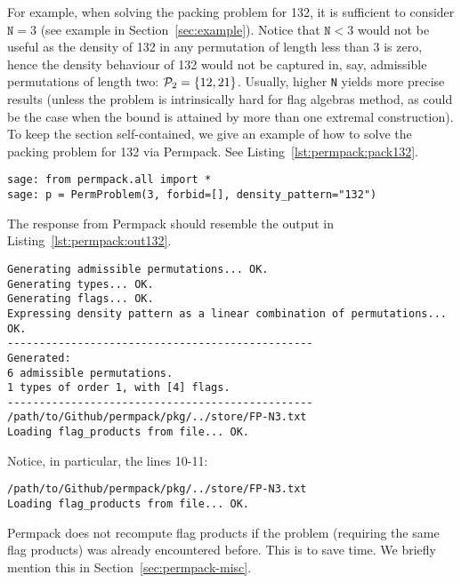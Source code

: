 For example, when solving the packing problem for 132, it is sufficient to consider $\texttt{N}=3$ (see example in Section~\ref{sec:example}). Notice that $\texttt{N}<3$ would not be useful as the density of 132 in any permutation of length less than 3 is zero, hence the density behaviour of 132 would not be captured in, say, admissible permutations of length two: $\P_2 = \{12,21\}$. Usually, higher \texttt{N} yields more precise results (unless the problem is intrinsically hard for flag algebras method, as could be the case when the bound is attained by more than one extremal construction). To keep the section self-contained, we give an example of how to solve the packing problem for 132 via Permpack. See Listing~\ref{lst:permpack:pack132}.

 {}
\begin{lstlisting}
sage: from permpack.all import *
sage: p = PermProblem(3, forbid=[], density_pattern="132")
\end{lstlisting}
The response from Permpack should resemble the output in Listing~\ref{lst:permpack:out132}.
\begin{lstlisting}
Generating admissible permutations... OK.
Generating types... OK.
Generating flags... OK.
Expressing density pattern as a linear combination of permutations... OK.
------------------------------------------------
Generated:
6 admissible permutations.
1 types of order 1, with [4] flags.
------------------------------------------------
/path/to/Github/permpack/pkg/../store/FP-N3.txt
Loading flag_products from file... OK.
\end{lstlisting}
Notice, in particular, the lines 10-11:
\begin{lstlisting}
/path/to/Github/permpack/pkg/../store/FP-N3.txt
Loading flag_products from file... OK.
\end{lstlisting}
Permpack does not recompute flag products if the problem (requiring the same flag products) was already encountered before. This is to save time. We briefly mention this in Section~\ref{sec:permpack-misc}.

